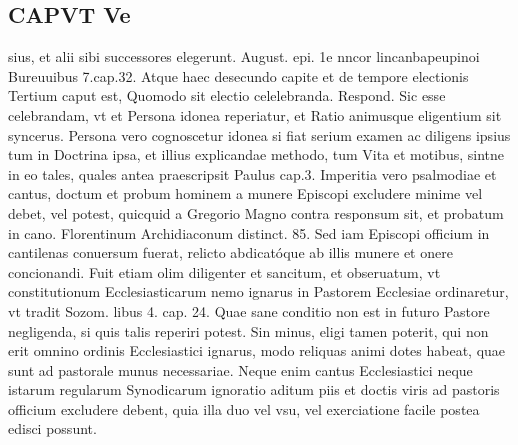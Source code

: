 \documentclass{article}
\begin{document}
\begin{pages}
\section*{CAPVT  Ve }
\marginpar{[ p.357 ]}\pstart sius, et alii sibi successores elegerunt. August. epi. 1e nncor lincanbapeupinoi Bureuuibus 7.cap.32. Atque  haec desecundo capite et de tempore electionis  \pend\pstart Tertium caput est, Quomodo sit electio celelebranda. Respond. Sic esse celebrandam, vt et Persona idonea reperiatur, et Ratio animusque eligentium sit syncerus.  \pend\pstart Persona vero cognoscetur idonea si fiat serium examen ac diligens ipsius tum in Doctrina ipsa, et illius explicandae methodo, tum Vita et motibus, sintne in eo tales, quales antea praescripsit Paulus cap.3.  \pend\pstart Imperitia vero psalmodiae et cantus, doctum et probum hominem a munere Episcopi excludere minime vel debet, vel potest, quicquid a Gregorio Magno contra responsum sit, et probatum in cano. Florentinum Archidiaconum distinct. 85. Sed iam Episcopi officium in cantilenas conuersum fuerat, relicto abdicatóque ab illis munere et onere concionandi. Fuit etiam olim diligenter et sancitum, et obseruatum, vt constitutionum Ecclesiasticarum nemo ignarus in Pastorem Ecclesiae ordinaretur, vt tradit Sozom. libus 4. cap. 24. Quae sane conditio non est in futuro Pastore negligenda, si quis talis reperiri potest. Sin minus, eligi tamen poterit, qui non erit omnino ordinis Ecclesiastici ignarus, modo reliquas animi dotes habeat, quae sunt ad pastorale munus necessariae. Neque enim cantus Ecclesiastici neque  istarum regularum Synodicarum ignoratio aditum piis et doctis viris ad pastoris officium excludere debent, quia illa duo vel vsu, vel exerciatione facile postea edisci possunt.  \pend

\end{pages}
\end{document}
